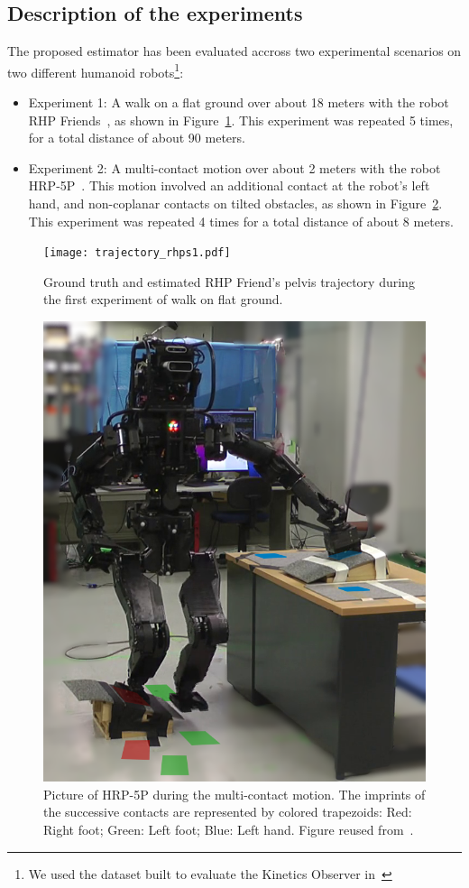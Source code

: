 \documentclass{IJCAS}
\begin{document}
\subsection{Description of the experiments}

The proposed estimator has been evaluated accross two experimental scenarios on two different humanoid robots\footnote{We used the dataset built to evaluate the Kinetics Observer in~\cite{Demont2024KineticsObserver}}:
\begin{itemize}
    \item Experiment 1: A walk on a flat ground over about 18 meters with the robot RHP Friends~\cite{Benallegue2025RhpFriendsJRL}, as shown in Figure~\ref{fig:trajRhps1}. This experiment was repeated 5 times, for a total distance of about 90 meters.
    \item Experiment 2: A multi-contact motion over about 2 meters with the robot HRP-5P~\cite{Kaneko2019Hrp5}. This motion involved an additional contact at the robot's left hand, and non-coplanar contacts on tilted obstacles, as shown in Figure~\ref{fig:hrp5_multicontact}. This experiment was repeated 4 times for a total distance of about 8 meters.
\end{itemize}


\begin{figure}[!ht]
\begin{center}
\texttt{[image: trajectory\_rhps1.pdf]} 
\vskip -0.5pc
\caption{Ground truth and estimated RHP Friend's pelvis trajectory during the first experiment of walk on flat ground.}\label{fig:trajRhps1}
\end{center}
\vskip -1.5pc
\end{figure}

\begin{figure}[!ht]
\begin{center}
\includegraphics[width=0.6\columnwidth]{multiContactExpe.jpg} 
\vskip -0.5pc
\caption{Picture of HRP-5P during the multi-contact motion. The imprints of the successive contacts are represented by colored trapezoids: Red: Right foot; Green: Left foot; Blue: Left hand. Figure reused from~\cite{Demont2024KineticsObserver}.}\label{fig:hrp5_multicontact}
\end{center}
\vskip -1.5pc
\end{figure}
\end{document}
